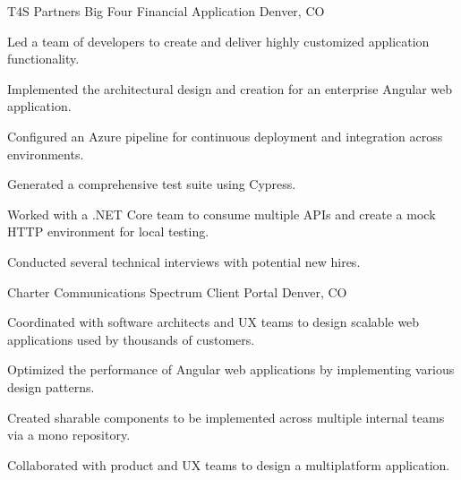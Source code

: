\begin{cventries}
    \cventry
    {T4S Partners} %
    {Big Four Financial Application} %
    {Denver, CO} %
    {} %
    {
    \begin{cvitems} %
        \item {Led a team of developers to create and deliver highly customized application functionality.}
        \item {Implemented the architectural design and creation for an enterprise Angular web application.}
        \item {Configured an Azure pipeline for continuous deployment and integration across environments.}
        \item {Generated a comprehensive test suite using Cypress.}
        \item {Worked with a .NET Core team to consume multiple APIs and create a mock HTTP environment for local testing.}
        \item {Conducted several technical interviews with potential new hires.}
    \end{cvitems}
    }

    \cventry
    {Charter Communications} %
    {Spectrum Client Portal} %
    {Denver, CO} %
    {} %
    {
    \begin{cvitems} %
        \item {Coordinated with software architects and UX teams to design scalable web applications used by thousands of customers.}
        \item {Optimized the performance of Angular web applications by implementing various design patterns.}
        \item {Created sharable components to be implemented across multiple internal teams via a mono repository.}
        \item {Collaborated with product and UX teams to design a multiplatform application.}
    \end{cvitems}
    }


\end{cventries}

